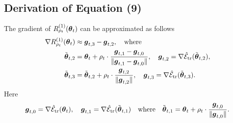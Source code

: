 \subsection{Derivation of Equation (9)}
\begin{claim}  \label{claim:gradient}
    The gradient of $R^{(1)}_{\rho_t}(\boldsymbol{\theta}_t)$ can be approximated as follows
    \begin{equation}
        \begin{aligned}
            \nabla R^{(1)}_{\rho_t}(\boldsymbol{\theta}_t) & \approx \boldsymbol{g}_{t,3} - \boldsymbol{g}_{t,2}, \quad \text{where} \\
            \tilde{\boldsymbol{\theta}}_{t,2} & = \boldsymbol{\theta}_t + \rho_t \cdot \frac{\boldsymbol{g}_{t,1} - \boldsymbol{g}_{t,0}}{\|\boldsymbol{g}_{t,1} - \boldsymbol{g}_{t,0}\|}, \quad \boldsymbol{g}_{t,2} = \nabla \hat{\mathcal{E}}_{{\text{tr}}}(\tilde{\boldsymbol{\theta}}_{t,2}), \\
            \tilde{\boldsymbol{\theta}}_{t,3} & = \tilde{\boldsymbol{\theta}}_{t,2} + \rho_t \cdot \frac{\boldsymbol{g}_{t,2}}{\|\boldsymbol{g}_{t,2}\|}, \quad \boldsymbol{g}_{t,3} = \nabla \hat{\mathcal{E}}_{{\text{tr}}}(\tilde{\boldsymbol{\theta}}_{t,3}).
        \end{aligned}
    \end{equation}
    Here
    \begin{equation}
        \boldsymbol{g}_{t,0} = \nabla \hat{\mathcal{E}}_{{\text{tr}}} (\boldsymbol{\theta}_t), \quad
        \boldsymbol{g}_{t,1} = \nabla \hat{\mathcal{E}}_{{\text{tr}}}(\tilde{\boldsymbol{\theta}}_{t,1}) \quad \text{where} \quad \tilde{\boldsymbol{\theta}}_{t, 1} = \boldsymbol{\theta}_t + \rho_t \cdot \frac{\boldsymbol{g}_{t,0}}{\|\boldsymbol{g}_{t,0}\|}.
    \end{equation}
\end{claim}
